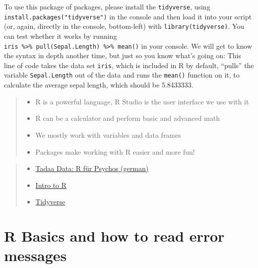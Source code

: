 \documentclass[
]{book}
\providecommand{\tightlist}{%
  \setlength{\itemsep}{0pt}\setlength{\parskip}{0pt}}
\begin{document}
To use this package of packages, please install the \texttt{tidyverse}, using \texttt{install.packages("tidyverse")} in the console and then load it into your script (or, again, directly in the console, bottom-left) with \texttt{library(tidyverse)}.
You can test whether it works by running \texttt{iris\ \%\textgreater{}\%\ pull(Sepal.Length)\ \%\textgreater{}\%\ mean()} in your console.
We will get to know the syntax in depth another time, but just so you know what's going on:
This line of code takes the data set \texttt{iris}, which is included in R by default, ``pulls'' the variable \texttt{Sepal.Length} out of the data and runs the \texttt{mean()} function on it, to calculate the average sepal length, which should be 5.8433333.

\begin{quote}
\begin{itemize}
\tightlist
\item
  R is a powerful language, R Studio is the user interface we use with it
\item
  R can be a calculator and perform basic and advanced math
\item
  We mostly work with variables and data frames
\item
  Packages make working with R easier and more fun!
\end{itemize}
\end{quote}

\begin{quote}
\begin{itemize}
\tightlist
\item
  \href{https://r-intro.tadaa-data.de/index.html}{Tadaa Data: R für Psychos (german)}
\item
  \href{https://www.kaggle.com/code/hamelg/intro-to-r-part-4-variables}{Intro to R}
\item
  \href{https://www.tidyverse.org/}{Tidyverse}
\end{itemize}
\end{quote}

\chapter{R Basics and how to read error messages}\label{r-basics-and-how-to-read-error-messages}
\end{document}
